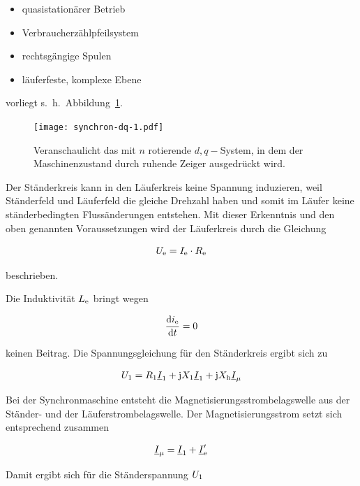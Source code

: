 \begin{itemize}
	\item quasistationärer Betrieb
	\item Verbraucherzählpfeilsystem
	\item rechtsgängige Spulen
	\item läuferfeste, komplexe Ebene
\end{itemize}

vorliegt s.~h.~Abbildung~\ref{fig:dq-synchron-1}.

\begin{figure}[!h]
\centering
\texttt{[image: synchron-dq-1.pdf]}
\label{fig:dq-synchron-1}
\caption{Veranschaulicht das mit $n$ rotierende $d, q-$System, in dem der Maschinenzustand durch ruhende Zeiger ausgedrückt wird.}
\end{figure}

Der Ständerkreis kann in den Läuferkreis keine Spannung induzieren, weil Ständerfeld und Läuferfeld die gleiche Drehzahl haben und somit im Läufer keine ständerbedingten Flussänderungen entstehen.
Mit dieser Erkenntnis und den oben genannten Voraussetzungen wird der Läuferkreis durch die Gleichung

\begin{align}
U_{\mathrm{e}} = I_{\mathrm{e}} \cdot R_{\mathrm{e}}
\end{align}

beschrieben.

Die Induktivität $L_{\mathrm{e}}$ bringt wegen

\begin{align*}
\frac{\mathrm{d}i_{\mathrm{e}}}{\mathrm{d}t} = 0
\end{align*}

keinen Beitrag.
Die Spannungsgleichung für den Ständerkreis ergibt sich zu

\begin{align}
U_{\mathrm{1}} = R_{\mathrm{1}}\underline{I}_{\mathrm{1}}+\mathrm{j}X_{\mathrm{1}}\underline{I}_{\mathrm{1}}+\mathrm{j}X_{\mathrm{h}}\underline{I}_\mu
\end{align}

Bei der Synchronmaschine entsteht die Magnetisierungsstrombelagswelle aus der Ständer- und der Läuferstrombelagswelle.
Der Magnetisierungsstrom setzt sich entsprechend zusammen

\begin{align}
\underline{I}_\mu = \underline{I}_{\mathrm{1}} + \underline{I}'_{\mathrm{e}}
\end{align}

Damit ergibt sich für die Ständerspannung $U_{\mathrm{1}}$

